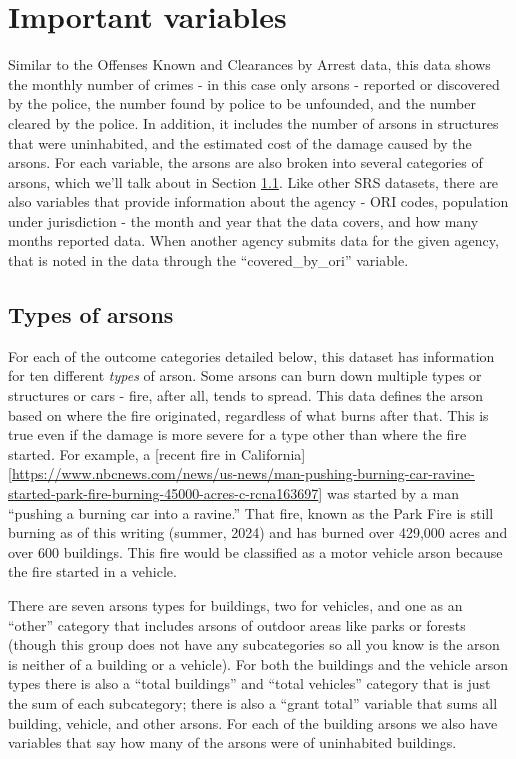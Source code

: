 \documentclass[
  12pt,
  openany]{book}
\begin{document}
\section{Important variables}\label{important-variables-5}

Similar to the Offenses Known and Clearances by Arrest data, this data shows the monthly number of crimes - in this case only arsons - reported or discovered by the police, the number found by police to be unfounded, and the number cleared by the police. In addition, it includes the number of arsons in structures that were uninhabited, and the estimated cost of the damage caused by the arsons. For each variable, the arsons are also broken into several categories of arsons, which we'll talk about in Section \ref{arsonType}. Like other SRS datasets, there are also variables that provide information about the agency - ORI codes, population under jurisdiction - the month and year that the data covers, and how many months reported data. When another agency submits data for the given agency, that is noted in the data through the ``covered\_by\_ori'' variable.

\subsection{Types of arsons}\label{arsonType}

For each of the outcome categories detailed below, this dataset has information for ten different \emph{types} of arson. Some arsons can burn down multiple types or structures or cars - fire, after all, tends to spread. This data defines the arson based on where the fire originated, regardless of what burns after that. This is true even if the damage is more severe for a type other than where the fire started. For example, a {[}recent fire in California{]}{[}\url{https://www.nbcnews.com/news/us-news/man-pushing-burning-car-ravine-started-park-fire-burning-45000-acres-c-rcna163697}{]} was started by a man ``pushing a burning car into a ravine.'' That fire, known as the Park Fire is still burning as of this writing (summer, 2024) and has burned over 429,000 acres and over 600 buildings. This fire would be classified as a motor vehicle arson because the fire started in a vehicle.

There are seven arsons types for buildings, two for vehicles, and one as an ``other'' category that includes arsons of outdoor areas like parks or forests (though this group does not have any subcategories so all you know is the arson is neither of a building or a vehicle). For both the buildings and the vehicle arson types there is also a ``total buildings'' and ``total vehicles'' category that is just the sum of each subcategory; there is also a ``grant total'' variable that sums all building, vehicle, and other arsons. For each of the building arsons we also have variables that say how many of the arsons were of uninhabited buildings.
\end{document}
